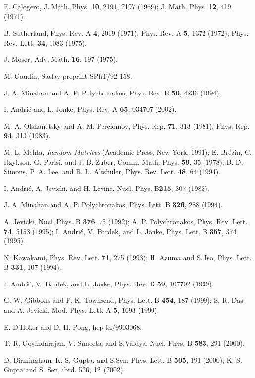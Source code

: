 \documentclass[a4paper,preprint,aps]{revtex4}
\def\Journal#1#2#3#4{{#1}{\bf #2},#3 (#4)}
\def\prd{{ Phys. Rev.} D}
\def\pra{{ Phys. Rev.} A}
\def\prb{{ Phys. Rev.} B}
\def\npb{{ Nucl. Phys.} B}
\def\prl{ Phys. Rev. Lett.}
\def\cmp{ Comm. Math. Phys.}
\def\plb{{ Phys. Lett.} B}
\def\mpla{{ Mod. Phys. Lett.} A}
\begin{document}
\begin{thebibliography}{99}

F. Calogero, {J. Math. Phys.} {\bf 10}, 2191, 2197 (1969);
{J. Math. Phys.} {\bf 12}, 419 (1971).

B. Sutherland, \Journal{\pra}{ 4}{ 2019} {1971}; \Journal{\pra}{ 5}{ 1372} 
{1972}; \Journal{\prl}{ 34}{ 1083} {1975}.

J. Moser, {Adv. Math.} {\bf 16}, 197 (1975).

M. Gaudin, Saclay preprint SPhT/92-158.

J. A. Minahan and A. P. Polychronakos, \Journal{\prb}{ 50}{ 4236}{1994}.

I. Andri\' c and L. Jonke, \Journal{\pra}{ 65}{ 034707}{2002}.

M. A. Olshanetsky and A. M. Perelomov, {Phys. Rep.} {\bf 71}, 313 (1981);
 {Phys. Rep.} {\bf 94}, 313 (1983).

M. L. Mehta, {\em Random Matrices} (Academic Press, New York, 1991); 
E. Br\'ezin, C. Itzykson, G. Parisi, and J. B. Zuber, \Journal{\cmp}{ 59}{ 35} 
{1978}; B. D. Simons, P. A. Lee, and B. L. Altshuler, \Journal{\prl}{ 48}{ 64} 
{1994}.

I. Andri\'{c}, A. Jevicki, and H. Levine, \Journal{\npb}{215}{ 307}{1983}.

J. A. Minahan and A. P. Polychronakos, \Journal{\plb}{ 326}{ 288}{1994}.

A. Jevicki, \Journal{\npb}{ 376}{ 75}{1992};
 A. P. Polychronakos, \Journal{\prl}{ 74}{ 5153}{1995};
 I. Andri\'{c}, V. Bardek, and L. Jonke, \Journal{\plb}{ 357}{ 374}{1995}.

N. Kawakami, \Journal{\prl}{ 71}{ 275}{1993}; H. Azuma and S. Iso, 
\Journal{\plb}{ 331}{ 107}{1994}.

I. Andri\'c, V. Bardek, and L. Jonke, \Journal{\prd}{ 59}{ 107702}{1999}.

G. W. Gibbons and P. K. Townsend, \Journal{\plb}{ 454}{ 187}{1999};
S. R. Das and A. Jevicki, \Journal{\mpla}{ 5}{ 1693}{1990}.    

E. D'Hoker and D. H. Pong, hep-th/9903068.

T. R. Govindarajan, V. Suneeta, and S.Vaidya, \Journal{\npb}{ 583}{ 291}{2000}.

D. Birmingham, K. S. Gupta, and S.Sen, \Journal{\plb}{ 505}{ 191}{2000};
K. S. Gupta and S. Sen, ibrd. 526, 121(2002).


\end{thebibliography}
\end{document}
